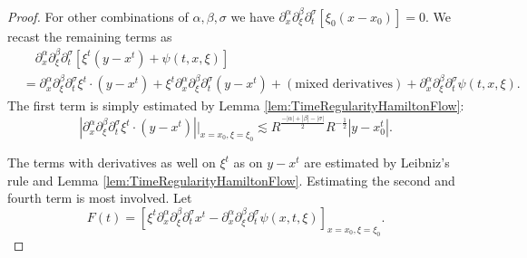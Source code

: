\documentclass[10pt,a4paper]{amsart}
\begin{document}
\begin{proof}
For other combinations of $\alpha,\beta,\sigma$ we have $\partial_x^{\alpha} \partial_{\xi}^{\beta} \partial_t^{\sigma} [ \xi_0 (x-x_0)] = 0$. We recast the remaining terms as
\begin{equation*}
\begin{split}
&\quad \partial_x^{\alpha} \partial_{\xi}^{\beta} \partial_t^{\sigma} [  \xi^t (y-x^t) +  \psi(t,x,\xi)] \\
 &=  \partial_x^{\alpha} \partial_{\xi}^{\beta} \partial_{t}^{\sigma} \xi^t \cdot (y-x^t) +  \xi^t \partial_x^{\alpha} \partial_{\xi}^{\beta} \partial_t^{\sigma} (y-x^t) + (\text{mixed derivatives}) + \partial_x^{\alpha} \partial_{\xi}^{\beta} \partial_t^{\sigma}  \psi(t,x,\xi).
\end{split}
\end{equation*}
The first term is simply estimated by Lemma \ref{lem:TimeRegularityHamiltonFlow}:
\begin{equation*}
|\partial_x^{\alpha} \partial_{\xi}^{\beta} \partial_t^{\sigma} \xi^t \cdot (y-x^t)| \big\vert_{x=x_0,\xi=\xi_0} \lesssim R^{\frac{-|\alpha|+|\beta|-|\sigma|}{2}} R^{-\frac{1}{2}} |y-x_0^t|.
\end{equation*}

The terms with derivatives as well on $\xi^t$ as on $y-x^t$ are estimated by Leibniz's rule and Lemma \ref{lem:TimeRegularityHamiltonFlow}. Estimating the second and fourth term is most involved. Let
\begin{equation*}
F(t) = [ \xi^t \partial_x^{\alpha} \partial_{\xi}^{\beta} \partial_t^{\sigma} x^t - \partial_x^{\alpha} \partial_{\xi}^{\beta} \partial_t^{\sigma} \psi(x,t,\xi) ]_{x=x_0,\xi=\xi_0}.
\end{equation*}


\end{proof}
\end{document}
